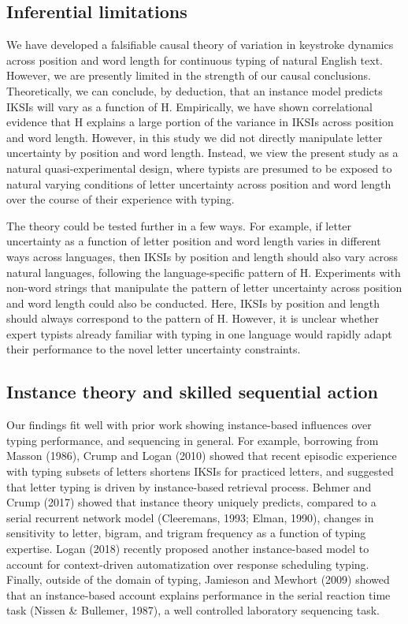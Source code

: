 \documentclass[,man,floatsintext]{apa6}
\begin{document}
\hypertarget{inferential-limitations}{%
\subsection{Inferential limitations}\label{inferential-limitations}}

We have developed a falsifiable causal theory of variation in keystroke dynamics across position and word length for continuous typing of natural English text. However, we are presently limited in the strength of our causal conclusions. Theoretically, we can conclude, by deduction, that an instance model predicts IKSIs will vary as a function of H. Empirically, we have shown correlational evidence that H explains a large portion of the variance in IKSIs across position and word length. However, in this study we did not directly manipulate letter uncertainty by position and word length. Instead, we view the present study as a natural quasi-experimental design, where typists are presumed to be exposed to natural varying conditions of letter uncertainty across position and word length over the course of their experience with typing.

The theory could be tested further in a few ways. For example, if letter uncertainty as a function of letter position and word length varies in different ways across languages, then IKSIs by position and length should also vary across natural languages, following the language-specific pattern of H. Experiments with non-word strings that manipulate the pattern of letter uncertainty across position and word length could also be conducted. Here, IKSIs by position and length should always correspond to the pattern of H. However, it is unclear whether expert typists already familiar with typing in one language would rapidly adapt their performance to the novel letter uncertainty constraints.

\hypertarget{instance-theory-and-skilled-sequential-action}{%
\subsection{Instance theory and skilled sequential action}\label{instance-theory-and-skilled-sequential-action}}

Our findings fit well with prior work showing instance-based influences over typing performance, and sequencing in general. For example, borrowing from Masson (1986), Crump and Logan (2010) showed that recent episodic experience with typing subsets of letters shortens IKSIs for practiced letters, and suggested that letter typing is driven by instance-based retrieval process. Behmer and Crump (2017) showed that instance theory uniquely predicts, compared to a serial recurrent network model (Cleeremans, 1993; Elman, 1990), changes in sensitivity to letter, bigram, and trigram frequency as a function of typing expertise. Logan (2018) recently proposed another instance-based model to account for context-driven automatization over response scheduling typing. Finally, outside of the domain of typing, Jamieson and Mewhort (2009) showed that an instance-based account explains performance in the serial reaction time task (Nissen \& Bullemer, 1987), a well controlled laboratory sequencing task.
\end{document}
